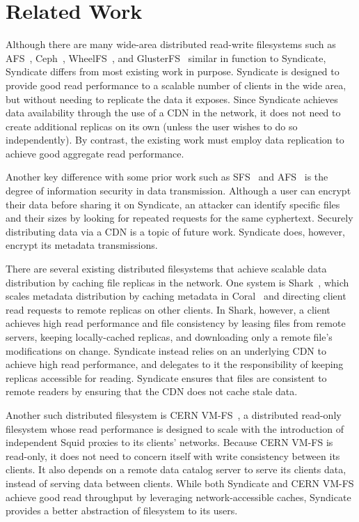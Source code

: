 \section{Related Work}

Although there are many wide-area distributed read-write filesystems such as AFS~\cite{AFS}, Ceph~\cite{Ceph}, 
WheelFS~\cite{WheelFS}, and GlusterFS~\cite{GlusterFS} similar in function to Syndicate, Syndicate differs from 
most existing work in purpose.  Syndicate is designed to provide good read performance to a scalable number of
clients in the wide area, but without needing to replicate the data it exposes.  Since Syndicate achieves data availability through the use of a CDN in the network, it does not need to create additional replicas on its 
own (unless the user wishes to do so independently).  By contrast, the existing work must employ data replication
to achieve good aggregate read performance.

Another key difference with some prior work such as SFS~\cite{SFS} and AFS~\cite{AFS} is the degree of information
security in data transmission.  Although a user can encrypt their data before sharing it on Syndicate, an attacker
can identify specific files and their sizes by looking for repeated requests for the same cyphertext.  Securely
distributing data via a CDN is a topic of future work.  Syndicate does, however, encrypt its metadata transmissions.

There are several existing distributed filesystems that achieve scalable data distribution by 
caching file replicas in the network.  One system is Shark~\cite{shark}, which scales metadata distribution by caching metadata in Coral~\cite{coral} and directing client read requests to remote replicas on other clients.  In Shark, 
however, a client achieves high read performance and file consistency by leasing files from remote
servers, keeping locally-cached replicas, and downloading only a remote file's modifications on change.
Syndicate instead relies on an underlying CDN to achieve high read performance, and delegates to it the responsibility
of keeping replicas accessible for reading.  Syndicate ensures that files are consistent to remote readers
by ensuring that the CDN does not cache stale data.

Another such distributed filesystem is CERN VM-FS~\cite{cern-vm-fs}, a distributed read-only filesystem whose
read performance is designed to scale with the introduction of independent Squid proxies to its clients'
networks.  Because CERN VM-FS is read-only, it does not need to concern itself with write consistency
between its clients.  It also depends on a remote data catalog server to serve its clients data, instead of
serving data between clients.  While both Syndicate and CERN VM-FS achieve good read throughput by leveraging
network-accessible caches, Syndicate provides a better abstraction of filesystem to its users.

